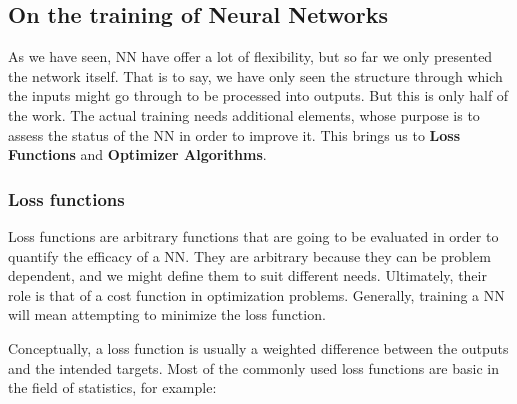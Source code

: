 \documentclass[a4paper, 11pt]{report}
\begin{document}
\subsection{On the training of Neural Networks}
As we have seen, NN have offer a lot of flexibility, but so far we only presented the network itself. That is to say, we have only seen the structure through which the inputs might go through to be processed into outputs. But this is only half of the work. The actual training needs additional elements, whose purpose is to assess the status of the NN in order to improve it. This brings us to \textbf{Loss Functions} and \textbf{Optimizer Algorithms}.

\subsubsection{Loss functions}\label{Theory: Loss functions}
Loss functions are arbitrary functions that are going to be evaluated in order to quantify the efficacy of a NN. They are arbitrary because they can be problem dependent, and we might define them to suit different needs. Ultimately, their role is that of a cost function in optimization problems. Generally, training a NN will mean attempting to minimize the loss function.

Conceptually, a loss function is usually a weighted difference between the outputs and the intended targets. Most of the commonly used loss functions are basic in the field of statistics, for example:
\end{document}
